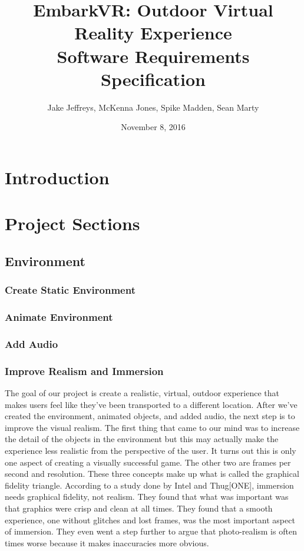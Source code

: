 \documentclass[10pt,journal,compsoc,onecolumn, draftclsnofoot]{IEEEtran}
\title{
EmbarkVR: Outdoor Virtual Reality Experience \\
\vspace{1cm}
Software Requirements Specification \\
\vspace{3cm}
}
\author{Jake Jeffreys, McKenna Jones, Spike Madden, Sean Marty}
\date{November 8, 2016}
\begin{document}
\begin{titlepage}
\vspace{3cm}
\maketitle
\vspace{3cm}

\end{titlepage}

\section{Introduction}


\section{Project Sections}
\subsection{Environment}
\subsubsection{Create Static Environment}

\subsubsection{Animate Environment}

\subsubsection{Add Audio}

\subsubsection{Improve Realism and Immersion}
The goal of our project is create a realistic, virtual, outdoor experience that makes users feel like they’ve been transported to a different location. After we’ve created the environment, animated objects, and added audio, the next step is to improve the visual realism. The first thing that came to our mind was to increase the detail of the objects in the environment but this may actually make the experience less realistic from the perspective of the user. It turns out this is only one aspect of creating a visually successful game. The other two are frames per second and resolution. These three concepts make up what is called the graphical fidelity triangle. According to a study done by Intel and Thug[ONE], immersion needs graphical fidelity, not realism. They found that what was important was that graphics were crisp and clean at all times. They found that a smooth experience, one without glitches and lost frames, was the most important aspect of immersion. They even went a step further to argue that photo-realism is often times worse because it makes inaccuracies more obvious.
\end{document}
